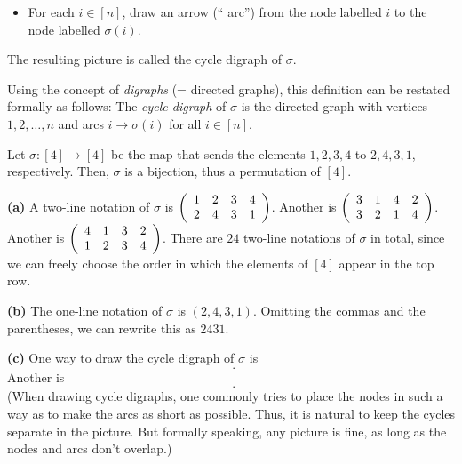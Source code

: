 \begin{definition}
\begin{itemize}
\item For each $i\in\left[  n\right]  $, draw an arrow (\textquotedblleft
arc\textquotedblright) from the node labelled $i$ to the node labelled
$\sigma\left(  i\right)  $.
\end{itemize}

The resulting picture is called the cycle digraph of $\sigma$.

Using the concept of \emph{digraphs} (= directed graphs), this definition can
be restated formally as follows: The \emph{cycle digraph} of $\sigma$ is the
directed graph with vertices $1,2,\ldots,n$ and arcs $i\rightarrow
\sigma\left(  i\right)  $ for all $i\in\left[  n\right]  $.
\end{definition}

\begin{example}
Let $\sigma:\left[  4\right]  \rightarrow\left[  4\right]  $ be the map that
sends the elements $1,2,3,4$ to $2,4,3,1$, respectively. Then, $\sigma$ is a
bijection, thus a permutation of $\left[  4\right]  $. \medskip

\textbf{(a)} A two-line notation of $\sigma$ is $\left(
\begin{array}
[c]{cccc}%
1 & 2 & 3 & 4\\
2 & 4 & 3 & 1
\end{array}
\right)  $. Another is $\left(
\begin{array}
[c]{cccc}%
3 & 1 & 4 & 2\\
3 & 2 & 1 & 4
\end{array}
\right)  $. Another is $\left(
\begin{array}
[c]{cccc}%
4 & 1 & 3 & 2\\
1 & 2 & 3 & 4
\end{array}
\right)  $. There are $24$ two-line notations of $\sigma$ in total, since we
can freely choose the order in which the elements of $\left[  4\right]  $
appear in the top row. \medskip

\textbf{(b)} The one-line notation of $\sigma$ is $\left(  2,4,3,1\right)  $.
Omitting the commas and the parentheses, we can rewrite this as $2431$.
\medskip

\textbf{(c)} One way to draw the cycle digraph of $\sigma$ is
\[%
\ \ .
\]
Another is
\[%
\ \ .
\]
(When drawing cycle digraphs, one commonly tries to place the nodes in such a
way as to make the arcs as short as possible. Thus, it is natural to keep the
cycles separate in the picture. But formally speaking, any picture is fine, as
long as the nodes and arcs don't overlap.)
\end{example}


